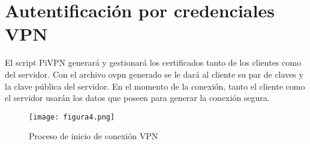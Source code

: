 \chapter{Autentificación por credenciales VPN}
\label{anexo:a}
El script PiVPN  generará y gestionará los certificados tanto de los clientes como del servidor. Con el archivo ovpn generado se le dará al cliente su par de claves y la clave pública del servidor. En el momento de la conexión, tanto el cliente como el servidor usarán los datos que poseen para generar la conexión segura.

\begin{figure}[H]
  \centering
  \texttt{[image: figura4.png]}
  \caption{Proceso de inicio de conexión VPN}
  \label{fig:SSLHandshake}
\end{figure}